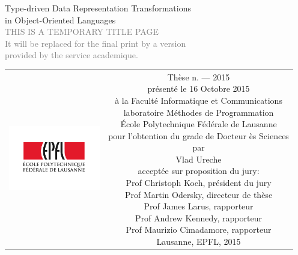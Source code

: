 \begin{titlepage}
\begin{center}
\sffamily


\null\vspace{2cm}
{\huge Type-driven Data Representation Transformations\\[12pt] in Object-Oriented Languages} \\[24pt]
\textcolor{gray}{\small{THIS IS A TEMPORARY TITLE PAGE \\ It will be replaced for the final print by a version \\ provided by the service academique.}}

\vfill

\begin{tabular} {cc}
\parbox{0.3\textwidth}{\includegraphics[width=4cm]{images/epfl}}
&
\parbox{0.7\textwidth}{%
	Thèse n. --- 2015\\
	présenté le 16 Octobre 2015\\
	à la Faculté Informatique et Communications\\
	laboratoire Méthodes de Programmation\\[2em]
%
	École Polytechnique Fédérale de Lausanne\\[6pt]
	pour l'obtention du grade de Docteur ès Sciences\\
	par\\ [4pt]
	\null \hspace{3em} Vlad Ureche\\[9pt]
%
\small
acceptée sur proposition du jury:\\[4pt]
%
    Prof Christoph Koch, président du jury\\
    Prof Martin Odersky, directeur de thèse\\
    Prof James Larus, rapporteur\\
    Prof Andrew Kennedy, rapporteur\\
    Prof Maurizio Cimadamore, rapporteur\\[12pt]
%
Lausanne, EPFL, 2015}
\end{tabular}
\end{center}
\vspace{2cm}
\end{titlepage}



